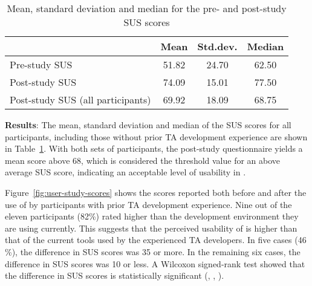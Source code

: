 \documentclass[10pt,conference,letterpaper]{IEEEtran}
\newcommand{\opentee}{\protect{TEE-Vi}\xspace}
\newcommand{\opentee}{\protect{Open-TEE}\xspace}
\begin{document}
\begin{table}
\centering
\caption{Mean, standard deviation and median for the pre- and post-study SUS scores}
\label{tbl:user-study-scores}
\begin{tabular}{l c c c}
  & Mean & Std.dev. & Median \\
  \hline
  Pre-study SUS & 51.82 & 24.70 & 62.50 \\
  \rowcolor{black!15} \cellcolor{black!15}Post-study SUS & 74.09 &
  15.01 & 77.50 \\
  Post-study SUS \tiny(all participants) & 69.92 & 18.09 & 68.75 \\
  \hline
\end{tabular}
\end{table}

\noindent\textbf{Results}: 
The mean, standard deviation and median of the SUS scores for all
participants, including those without prior TA development experience
are shown in Table~\ref{tbl:user-study-scores}. With both sets of
participants, the post-study questionnaire yields a mean score above
68, which is considered the threshold value for an above average SUS
score, indicating an acceptable level of usability in \opentee.

Figure~\ref{fig:user-study-scores} shows the scores reported both
before and after the use of \opentee by participants with prior TA
development experience. Nine out of the eleven participants (82\%) rated
\opentee higher than the development environment they are using
currently. This suggests that the perceived usability of \opentee is
higher than that of the current tools used by the experienced TA
developers. In five cases (46 \%), the difference in SUS scores was 35
or more. In the remaining six cases, the difference in SUS scores was
10 or less. A Wilcoxon signed-rank test showed that the difference in
SUS scores is statistically significant (, , ).
\end{document}
